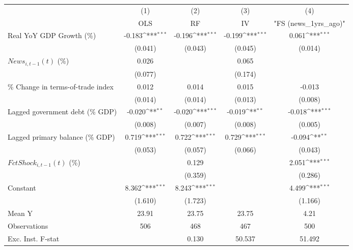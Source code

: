 {
\def\sym#1{\ifmmode^{#1}\else\(^{#1}\)\fi}
\begin{tabular}{l*{4}{c}}
\toprule
                    &\multicolumn{1}{c}{(1)}&\multicolumn{1}{c}{(2)}&\multicolumn{1}{c}{(3)}&\multicolumn{1}{c}{(4)}\\
                    &\multicolumn{1}{c}{OLS}&\multicolumn{1}{c}{RF}&\multicolumn{1}{c}{IV}&\multicolumn{1}{c}{ "FS (news_1yrs_ago)" }\\
\midrule
Real YoY GDP Growth (\%)&      -0.183\sym{***}&      -0.196\sym{***}&      -0.199\sym{***}&       0.061\sym{***}\\
                    &     (0.041)         &     (0.043)         &     (0.045)         &     (0.014)         \\
\addlinespace
$ News_{i,t-1}(t)$ (\%)&       0.026         &                     &       0.065         &                     \\
                    &     (0.077)         &                     &     (0.174)         &                     \\
\addlinespace
\% Change in terms-of-trade index&       0.012         &       0.014         &       0.015         &      -0.013         \\
                    &     (0.014)         &     (0.014)         &     (0.013)         &     (0.008)         \\
\addlinespace
Lagged government debt (\% GDP)&      -0.020\sym{**} &      -0.020\sym{***}&      -0.019\sym{**} &      -0.018\sym{***}\\
                    &     (0.008)         &     (0.007)         &     (0.008)         &     (0.005)         \\
\addlinespace
Lagged primary balance (\% GDP)&       0.719\sym{***}&       0.722\sym{***}&       0.729\sym{***}&      -0.094\sym{**} \\
                    &     (0.053)         &     (0.057)         &     (0.066)         &     (0.043)         \\
\addlinespace
$ FctShock_{i,t-1}(t)$ (\%)&                     &       0.129         &                     &       2.051\sym{***}\\
                    &                     &     (0.359)         &                     &     (0.286)         \\
\addlinespace
Constant            &       8.362\sym{***}&       8.243\sym{***}&                     &       4.499\sym{***}\\
                    &     (1.610)         &     (1.723)         &                     &     (1.166)         \\
\midrule
Mean Y              &       23.91         &       23.75         &       23.75         &        4.21         \\
Observations        &         506         &         468         &         467         &         500         \\
Exc. Inst. F-stat   &                     &       0.130         &      50.537         &      51.492         \\
\bottomrule
\end{tabular}
}
